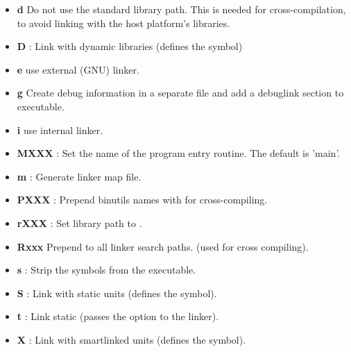 \begin{description}
\begin{itemize}
\item \textbf{d} Do not use the standard library path. This is needed for
cross-compilation, to avoid linking with the host platform's libraries.
\item \textbf{D} : Link with dynamic libraries (defines the
 symbol) 
\item \textbf{e} use external (GNU) linker.
\item \textbf{g} Create debug information in a separate file and add a debuglink section to executable.
\item \textbf{i} use internal linker.
\item \textbf{MXXX} : Set the name of the program entry routine.
The default is 'main'.
\item \textbf{m} : Generate linker map file.
\item \textbf{PXXX} : Prepend binutils names with   for cross-compiling.
\item \textbf{rXXX} : Set library path to .
\item \textbf{Rxxx} Prepend  to all linker search paths. (used for
cross compiling).
\item \textbf{s} : Strip the symbols from the executable. 
\item \textbf{S} : Link with static units (defines the  symbol).
\item \textbf{t} : Link static (passes the  option to the linker). 
\item \textbf{X} : Link with smartlinked units (defines the
 symbol). 
\end{itemize}
\end{description}

%
%


